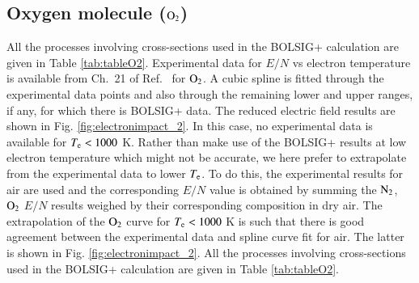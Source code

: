\subsection{Oxygen molecule ($\rm O_2$)}

All the processes involving cross-sections used in the BOLSIG+ calculation are given in Table \ref{tab:tableO2}. Experimental data for $E/N$ vs electron temperature is available from Ch.\ 21 of Ref.\  for $\rm O_2$. A cubic spline is fitted through the experimental data points and also through the remaining lower and upper ranges, if any, for which there is BOLSIG+ data.  The reduced electric field results are shown in Fig. \ref{fig:electronimpact_2}. In this case, no experimental data is available for $T_{\rm e}<1000$ K. Rather than make use of the BOLSIG+ results at low electron temperature which might not be accurate, we here prefer to extrapolate from the experimental data to lower $T_{\rm e}$. To do this, the experimental results for air are used and the corresponding $E/N$ value is obtained by summing the $\rm N_2$, $\rm O_2$ $E/N$ results weighed by their corresponding composition in dry air. The extrapolation of the $\rm O_2$ curve for $T_{\rm e}<1000$ K is such that there is good agreement between the experimental data and spline curve fit for air. The latter is shown in Fig. \ref{fig:electronimpact_2}. All the processes involving cross-sections used in the BOLSIG+ calculation are given in Table \ref{tab:tableO2}.
%



